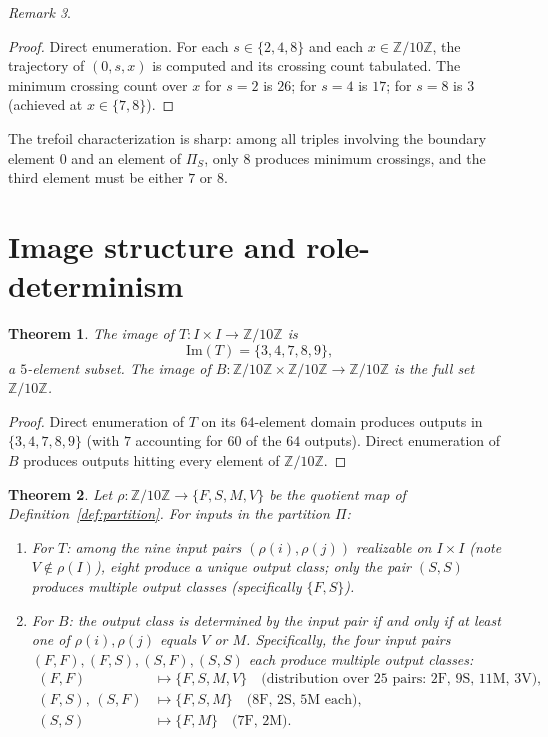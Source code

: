 \documentclass[submission,copyright,creativecommons]{eptcs}
\theoremstyle{plain}
\newtheorem{theorem}{Theorem}
\theoremstyle{definition}
\theoremstyle{remark}
\newtheorem{remark}[theorem]{Remark}
\begin{document}
\begin{remark}
\begin{proof}
Direct enumeration. For each $s \in \{2, 4, 8\}$ and each $x \in
\mathbb{Z}/10\mathbb{Z}$, the trajectory of $(0, s, x)$ is computed and its
crossing count tabulated. The minimum crossing count over $x$ for $s = 2$
is $26$; for $s = 4$ is $17$; for $s = 8$ is $3$ (achieved at $x \in \{7, 8\}$).
\end{proof}

The trefoil characterization is sharp: among all triples involving the
boundary element $0$ and an element of $\Pi_S$, only $8$ produces minimum
crossings, and the third element must be either $7$ or $8$.

\section{Image structure and role-determinism}\label{sec:image}

\begin{theorem}\label{thm:image}
The image of $T : I \times I \to \mathbb{Z}/10\mathbb{Z}$ is
\[
\mathrm{Im}(T) = \{3, 4, 7, 8, 9\},
\]
a $5$-element subset. The image of $B : \mathbb{Z}/10\mathbb{Z} \times
\mathbb{Z}/10\mathbb{Z} \to \mathbb{Z}/10\mathbb{Z}$ is the full set
$\mathbb{Z}/10\mathbb{Z}$.
\end{theorem}

\begin{proof}
Direct enumeration of $T$ on its $64$-element domain produces outputs in
$\{3, 4, 7, 8, 9\}$ (with $7$ accounting for $60$ of the $64$ outputs).
Direct enumeration of $B$ produces outputs hitting every element of
$\mathbb{Z}/10\mathbb{Z}$.
\end{proof}

\begin{theorem}\label{thm:role-determinism}
Let $\rho : \mathbb{Z}/10\mathbb{Z} \to \{F, S, M, V\}$ be the quotient
map of Definition~\ref{def:partition}. For inputs in the partition $\Pi$:
\begin{enumerate}
\item For $T$: among the nine input pairs $(\rho(i), \rho(j))$ realizable
on $I \times I$ (note $V \notin \rho(I)$), eight produce a unique output
class; only the pair $(S, S)$ produces multiple output classes (specifically
$\{F, S\}$).
\item For $B$: the output class is determined by the input pair if and
only if at least one of $\rho(i), \rho(j)$ equals $V$ or $M$. Specifically,
the four input pairs $(F, F), (F, S), (S, F), (S, S)$ each produce multiple
output classes:
\begin{align*}
(F, F) &\mapsto \{F, S, M, V\} \quad \text{(distribution over $25$ pairs: $2$F, $9$S, $11$M, $3$V),} \\
(F, S),\, (S, F) &\mapsto \{F, S, M\} \quad \text{($8$F, $2$S, $5$M each),} \\
(S, S) &\mapsto \{F, M\} \quad \text{($7$F, $2$M).}
\end{align*}
\end{enumerate}
\end{theorem}


\end{remark}
\end{document}

